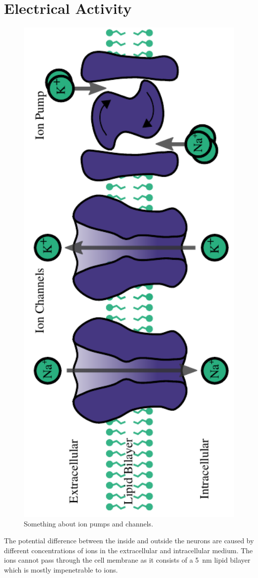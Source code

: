 \documentclass[altfont, fleqn]{uiophd}
\begin{document}
\section{Electrical Activity}
\begin{figure}[h]
    \centering
    \includegraphics[angle=-90,width=1.0\textwidth]{images/2_1/ion_pumps_0.pdf}
    \caption{Something about ion pumps and channels.}
    \label{fig:2_1_ion_channels}
\end{figure}
The potential difference between the inside and outside the neurons 
are caused by different concentrations of 
ions
in the extracellular and intracellular medium. 
The ions cannot pass through 
the cell membrane as it
consists of a \SI{5}{\nano\metre} lipid bilayer which is mostly impenetrable 
to ions. 
\end{document}
